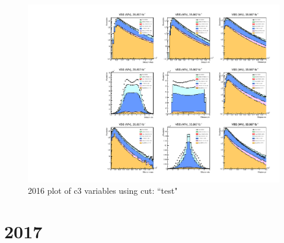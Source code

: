 \documentclass{article}
\begin{document}
                        \begin{figure}[H]
                            \centering
                            \caption{2016 plot of c3 variables using cut: ``test"}
                            \includegraphics[width=\textwidth]{2016/c3_2016_test.pdf}
                        \end{figure}    
    \section*{2017}
\end{document}
